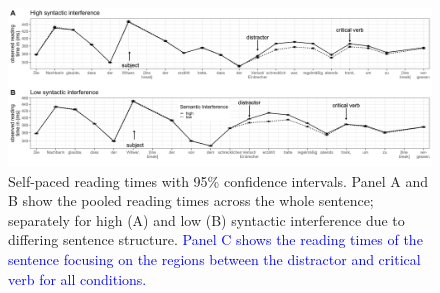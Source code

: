 \documentclass[review,preprint,12pt,authoryear,floatsintext]{elsarticle}
\begin{document}
\begin{figure}
    \caption{Self-paced reading times with 95\% confidence intervals. Panel A and B show the pooled reading times across the whole sentence; separately for high (A) and low (B) syntactic interference due to differing sentence structure. \textcolor{blue}{Panel C shows the reading times of the sentence focusing on the regions between the distractor and critical verb for all conditions.}}
    \label{fig:whole_sentence}
    \centering
    \includegraphics[width=\textwidth]{Pandora_all_wholesentence_pooled.jpg}
\end{figure}
\clearpage
\end{document}
